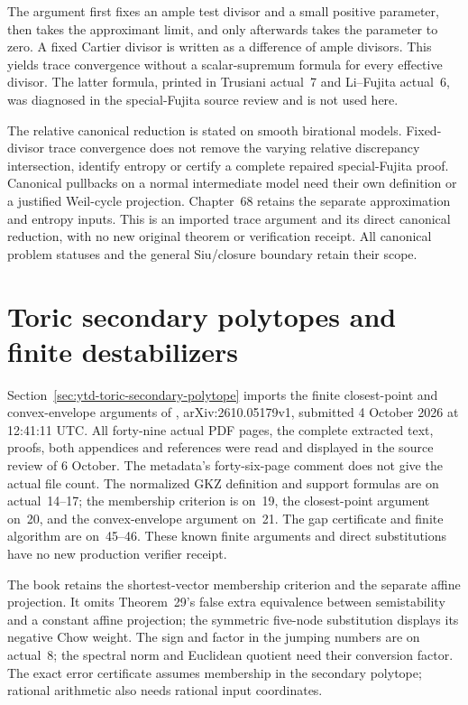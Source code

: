 The argument first fixes an ample test divisor and a small positive
parameter, then takes the approximant limit, and only afterwards
takes the parameter to zero. A fixed Cartier divisor is written
as a difference of ample divisors. This yields trace convergence
without a scalar-supremum formula for every effective divisor.
The latter formula, printed in Trusiani actual~7 and Li--Fujita
actual~6, was diagnosed in the special-Fujita source review and
is not used here.

The relative canonical reduction is stated on smooth birational
models. Fixed-divisor trace convergence does not remove the
varying relative discrepancy intersection, identify entropy or
certify a complete repaired special-Fujita proof. Canonical
pullbacks on a normal intermediate model need their own
definition or a justified Weil-cycle projection. Chapter~68
retains the separate approximation and entropy inputs. This is
an imported trace argument and its direct canonical reduction,
with no new original theorem or verification receipt. All canonical
problem statuses and the general Siu/closure boundary retain
their scope.

\section{Toric secondary polytopes and finite destabilizers}
\label{sec:provenance-toric-secondary-polytopes}

Section~\ref{sec:ytd-toric-secondary-polytope} imports the finite
closest-point and convex-envelope arguments of
\cite{LSY26SecondaryPolytopesV1}, arXiv:2610.05179v1, submitted
4 October 2026 at 12:41:11 UTC. All forty-nine actual PDF pages,
the complete extracted text, proofs, both appendices and references
were read and displayed in the source review of 6 October. The
metadata's forty-six-page comment does not give the actual file count.
The normalized GKZ definition and support formulas are on actual~14--17;
the membership criterion is on~19, the closest-point argument on~20,
and the convex-envelope argument on~21. The gap certificate and
finite algorithm are on~45--46. These known finite arguments and
direct substitutions have no new production verifier receipt.

The book retains the shortest-vector membership criterion and the
separate affine projection. It omits Theorem~29's false extra
equivalence between semistability and a constant affine projection;
the symmetric five-node substitution displays its negative Chow
weight. The sign and factor in the jumping numbers are on actual~8;
the spectral norm and Euclidean quotient need their conversion factor.
The exact error certificate assumes membership in the secondary
polytope; rational arithmetic also needs rational input coordinates.

